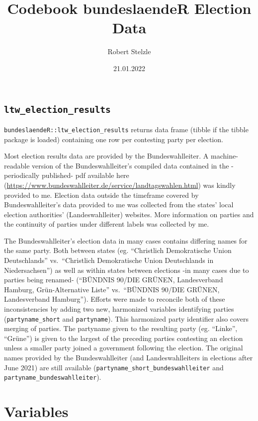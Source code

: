 \documentclass[
]{article}
\title{Codebook bundeslaendeR Election Data}
\author{Robert Stelzle}
\date{21.01.2022}
\begin{document}
\maketitle

\hypertarget{ltw_election_results}{%
\subsection{\texorpdfstring{\texttt{ltw\_election\_results}}{ltw\_election\_results}}\label{ltw_election_results}}

\texttt{bundeslaendeR::ltw\_election\_results} returns data frame
(tibble if the tibble package is loaded) containing one row per
contesting party per election.

Most election results data are provided by the Bundeswahlleiter. A
machine-readable version of the Bundeswahlleiter's compiled data
contained in the -periodically published- pdf available here
(\url{https://www.bundeswahlleiter.de/service/landtagswahlen.html}) was
kindly provided to me. Election data outside the timeframe covered by
Bundeswahlleiter's data provided to me was collected from the states'
local election authorities' (Landeswahlleiter) websites. More
information on parties and the continuity of parties under different
labels was collected by me.

The Bundeswahlleiter's election data in many cases contains differing
names for the same party. Both between states (eg. ``Christlich
Demokratische Union Deutschlands'' vs.~``Christlich Demokratische Union
Deutschlands in Niedersachsen'') as well as within states between
elections -in many cases due to parties being renamed- (``BÜNDNIS 90/DIE
GRÜNEN, Landesverband Hamburg, Grün-Alternative Liste'' vs.~``BÜNDNIS
90/DIE GRÜNEN, Landesverband Hamburg''). Efforts were made to reconcile
both of these inconsistencies by adding two new, harmonized variables
identifying parties (\texttt{partyname\_short} and \texttt{partyname}).
This harmonized party identifier also covers merging of parties. The
partyname given to the resulting party (eg. ``Linke'', ``Grüne'') is
given to the largest of the preceding parties contesting an election
unless a smaller party joined a government following the election. The
original names provided by the Bundeswahlleiter (and Landeswahlleiters
in elections after June 2021) are still available
(\texttt{partyname\_short\_bundeswahlleiter} and
\texttt{partyname\_bundeswahlleiter}).

\newpage

\hypertarget{variables}{%
\section{Variables}\label{variables}}
\end{document}
